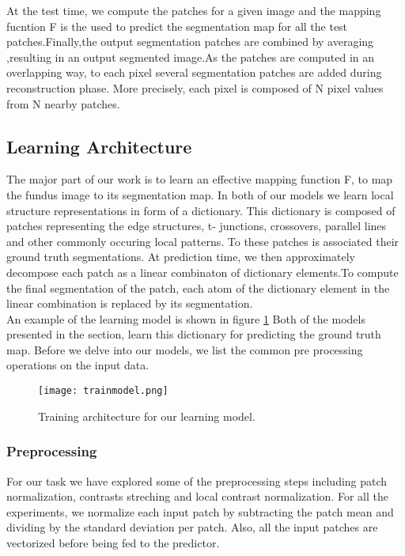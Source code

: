 At the test time, we compute the patches for a given image and the mapping fucntion F is the used to predict the segmentation map for all the test patches.Finally,the output segmentation patches are combined by averaging ,resulting in an output segmented image.As the patches are computed in an overlapping way, to each pixel several segmentation patches are added during reconstruction phase. More precisely, each pixel is composed of N pixel values from N nearby patches.\\

\subsection{Learning Architecture}
The major part of our work is to learn an effective mapping function F, to map the fundus image to its segmentation map. In both of our models we learn local structure representations in form of a dictionary. This dictionary is composed of patches representing the edge structures, t- junctions, crossovers, parallel lines and other commonly occuring local patterns. To these patches is associated their ground truth segmentations. At prediction time, we then approximately decompose each patch as a linear combinaton of dictionary elements.To compute the final segmentation of the patch, each atom of the dictionary element in the linear combination is replaced by its segmentation.\\

An example of the learning model is shown in figure \ref{fig:trainmodel}
Both of the models presented in the section, learn this dictionary for predicting the ground truth map.
Before we delve into our models, we list the common pre processing operations on the input data.
 \begin{figure}
 	\centering	
 	\texttt{[image: trainmodel.png]}
 	\caption{Training architecture for our learning model.}
 	\label{fig:trainmodel}		
 \end{figure}
\subsubsection{Preprocessing}
For our task we have explored some of the preprocessing steps including patch normalization, contrasts streching and local contrast normalization. For all the experiments, we normalize each input patch by subtracting the patch mean and dividing by the standard deviation per patch. Also, all the input patches are vectorized before being fed to the predictor.


